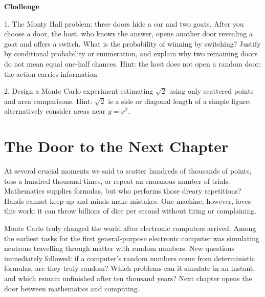 \textbf{Challenge}

1. The Monty Hall problem: three doors hide a car and two goats. After you choose a door, the host, who knows the answer, opens another door revealing a goat and offers a switch. What is the probability of winning by switching? Justify by conditional probability or enumeration, and explain why two remaining doors do not mean equal one-half chances. Hint: the host does not open a random door; the action carries information.

2. Design a Monte Carlo experiment estimating $\sqrt{2}$ using only scattered points and area comparisons. Hint: $\sqrt{2}$ is a side or diagonal length of a simple figure; alternatively consider areas near $y=x^2$.

\section*{The Door to the Next Chapter}

At several crucial moments we said to scatter hundreds of thousands of points, toss a hundred thousand times, or repeat an enormous number of trials. Mathematics supplies formulas, but who performs those dreary repetitions? Hands cannot keep up and minds make mistakes. One machine, however, loves this work: it can throw billions of dice per second without tiring or complaining.

Monte Carlo truly changed the world after electronic computers arrived. Among the earliest tasks for the first general-purpose electronic computer was simulating neutrons travelling through matter with random numbers. New questions immediately followed: if a computer's random numbers come from deterministic formulas, are they truly random? Which problems can it simulate in an instant, and which remain unfinished after ten thousand years? Next chapter opens the door between mathematics and computing.
